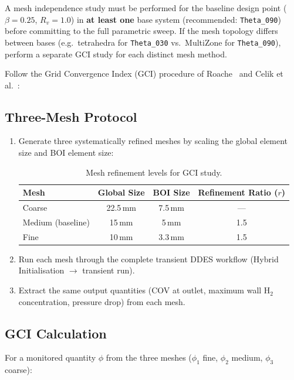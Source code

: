 \documentclass[12pt,a4paper]{report}
\begin{document}
A mesh independence study must be performed for the baseline design
point ($\beta = 0.25$, $R_v = 1.0$) in \textbf{at least one} base
system (recommended: \texttt{Theta\_090}) before committing to the
full parametric sweep.  If the mesh topology differs between bases
(e.g.\ tetrahedra for \texttt{Theta\_030} vs.\ MultiZone for
\texttt{Theta\_090}), perform a separate GCI study for each distinct
mesh method.

Follow the Grid Convergence Index (GCI) procedure of
Roache~\cite{Roache1994} and Celik et al.~\cite{Celik2008}:

\subsection{Three-Mesh Protocol}

\begin{enumerate}
  \item Generate three systematically refined meshes by scaling the
        global element size and BOI element size:

  \begin{table}[H]
  \centering
  \caption{Mesh refinement levels for GCI study.}
  \label{tab:meshlevels}
  \begin{tabular}{@{}lccc@{}}
  \toprule
  \textbf{Mesh} & \textbf{Global Size} & \textbf{BOI Size} &
  \textbf{Refinement Ratio ($r$)} \\
  \midrule
  Coarse & 22.5\,mm & 7.5\,mm & --- \\
  Medium (baseline) & 15\,mm & 5\,mm & 1.5 \\
  Fine   & 10\,mm & 3.3\,mm & 1.5 \\
  \bottomrule
  \end{tabular}
  \end{table}

  \item Run each mesh through the complete transient DDES workflow
        (Hybrid Initialisation $\rightarrow$ transient run).

  \item Extract the same output quantities (COV at outlet, maximum
        wall H$_2$ concentration, pressure drop) from each mesh.
\end{enumerate}

\subsection{GCI Calculation}

For a monitored quantity $\phi$ from the three meshes
($\phi_1$ fine, $\phi_2$ medium, $\phi_3$ coarse):
\end{document}
